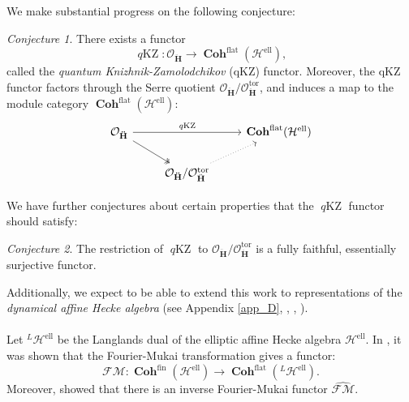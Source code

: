 \documentclass[a4paper]{report}
\theoremstyle{theorem}
\theoremstyle{definition}
\theoremstyle{remark}
\theoremstyle{proposition}
\theoremstyle{conjecture}
\newtheorem{conjecture}{Conjecture}
\theoremstyle{lemma}
\theoremstyle{corollary}
\theoremstyle{exercise}
\theoremstyle{example}
\newcommand{\mcal}{\mathcal}
\newcommand{\on}{\operatorname}
\newcommand{\coh}{\on{\mathbf{Coh}}}
\newcommand{\qKZ}{\on{\mathit{q}KZ}}
\begin{document}
  We make substantial progress on the following conjecture:
  \begin{conjecture}\label{main_thm1}
      There exists a functor 
      $$\qKZ : \mcal{O}_{\mathbf{\ddot{\mathbf{H}}}} \longrightarrow \coh^{\on{flat}}(\mcal{H}^{\on{ell}}),$$
      called the \emph{quantum Knizhnik-Zamolodchikov} (qKZ) functor.
      Moreover, the qKZ functor factors through the Serre quotient 
      $\mcal{O}_{\mathbf{\ddot{\mathbf{H}}}}/\mcal{O}_{\ddot{\mathbf{H}}}^{\on{tor}}$,
      and induces a map to the module category $\coh^{\on{flat}}(\mcal{H}^{\on{ell}})$:
      $$\begin{tikzcd}
          \mathcal{O}_{\mathbf{\ddot{\mathbf{H}}}} \arrow[rd, two heads] \arrow[rr, "\qKZ"] &                                                                                                       & \coh^{\on{flat}}(\mathcal{H}^{\on{ell}}) \\
                                                                              & \mathcal{O}_{\mathbf{\ddot{\mathbf{H}}}}/\mathcal{O}_{\ddot{\mathbf{H}}}^{\operatorname{tor}} \arrow[ru, dotted] &                                   
  \end{tikzcd}$$
  \end{conjecture}
  
  We have further conjectures about certain properties that the $\qKZ$ functor should satisfy:
  
  \begin{conjecture}\label{main_thm2}
  The restriction of $\qKZ$ to 
  $\mcal{O}_{\mathbf{\ddot{\mathbf{H}}}}/\mcal{O}_{\ddot{\mathbf{H}}}^{\on{tor}}$ is a 
  fully faithful, essentially surjective functor.
  \end{conjecture}
  
  Additionally, we expect to be able to extend this work to representations of the \emph{dynamical affine Hecke algebra} (see Appendix \ref{app_D}, \cite{ZZ21}, \cite{LZZ23}, \cite{ZZ24}).\\\\
  Let ${}^L\mcal{H}^{\on{ell}}$ be the Langlands dual of the elliptic 
  affine Hecke algebra $\mcal{H}^{\on{ell}}$. 
  In \cite[Corollary 5.1]{ZZ24}, it was shown that the Fourier-Mukai 
  transformation gives a functor:
  $$\mcal{FM} : \coh^{\on{fin}}(\mcal{H}^{\on{ell}}) \longrightarrow \coh^{\on{flat}}({}^L\mcal{H}^{\on{ell}}).$$
  Moreover, \cite[Corollary 5.2]{ZZ24} showed that there is an 
  inverse Fourier-Mukai functor $\widehat{\mcal{FM}}$.
  
\end{document}
